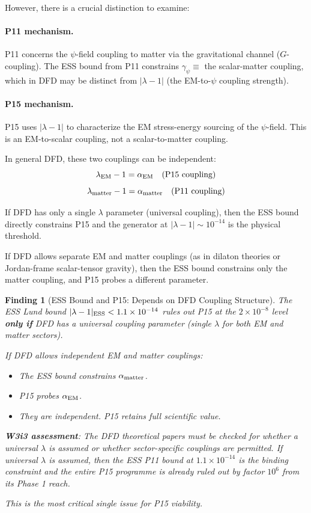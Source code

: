 \documentclass[11pt]{article}
\newtheorem{finding}{Finding}
\newcommand{\ee}[1]{\times 10^{#1}}
\newcommand{\lam}{\lambda}
\begin{document}
However, there is a crucial distinction to examine:

\paragraph{P11 mechanism.} P11 concerns the $\psi$-field coupling to matter
via the gravitational channel ($G$-coupling). The ESS bound from P11 constrains
$\gamma_\psi \equiv $ the scalar-matter coupling, which in DFD may be distinct
from $|\lam-1|$ (the EM-to-$\psi$ coupling strength).

\paragraph{P15 mechanism.} P15 uses $|\lam-1|$ to characterize the EM
stress-energy sourcing of the $\psi$-field. This is an EM-to-scalar coupling,
not a scalar-to-matter coupling.

In general DFD, these two couplings can be independent:
\begin{equation}
\lam_{\rm EM} - 1 = \alpha_{\rm EM} \quad \text{(P15 coupling)}
\end{equation}
\begin{equation}
\lam_{\rm matter} - 1 = \alpha_{\rm matter} \quad \text{(P11 coupling)}
\end{equation}

If DFD has only a single $\lam$ parameter (universal coupling), then the ESS
bound directly constrains P15 and the generator at $|\lam-1| \sim 10^{-14}$
is the physical threshold.

If DFD allows separate EM and matter couplings (as in dilaton theories or
Jordan-frame scalar-tensor gravity), then the ESS bound constrains only the
matter coupling, and P15 probes a different parameter.

\begin{finding}[ESS Bound and P15: Depends on DFD Coupling Structure]
\label{find:ess-bound}
The ESS Lund bound $|\lam-1|_{\rm ESS} < 1.1\ee{-14}$ rules out P15 at the
$2\ee{-8}$ level \textbf{only if} DFD has a universal coupling parameter
(single $\lam$ for both EM and matter sectors).

If DFD allows independent EM and matter couplings:
\begin{itemize}
\item The ESS bound constrains $\alpha_{\rm matter}$.
\item P15 probes $\alpha_{\rm EM}$.
\item They are independent. P15 retains full scientific value.
\end{itemize}

\textbf{W3i3 assessment}: The DFD theoretical papers must be checked for
whether a universal $\lam$ is assumed or whether sector-specific couplings
are permitted. If universal $\lam$ is assumed, then the ESS P11 bound at
$1.1\ee{-14}$ is the binding constraint and the entire P15 programme is
already ruled out by factor $10^6$ from its Phase 1 reach.

This is the most critical single issue for P15 viability.
\end{finding}
\end{document}
